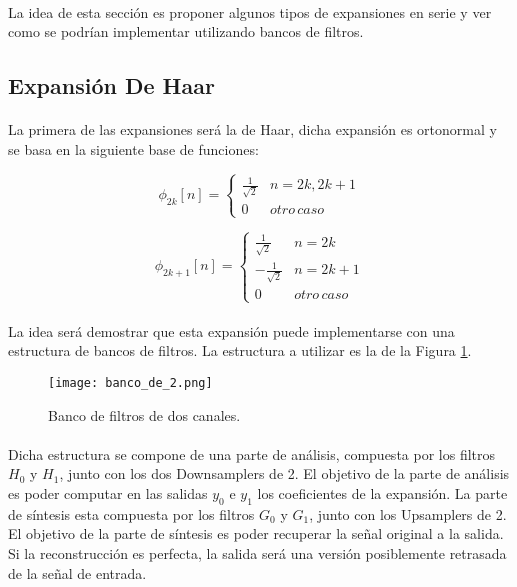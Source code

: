 \paragraph{}
La idea de esta sección es proponer algunos tipos de expansiones en serie y ver como se podrían implementar utilizando bancos de filtros.

\subsection{Expansión De Haar}

\paragraph{}
La primera de las expansiones será la de Haar, dicha expansión es ortonormal y se basa en la siguiente base de funciones:

\[ \phi_{2k}[n] = \begin{cases} 
      \frac{1}{\sqrt{2}} & n = 2 k, 2 k + 1 \\
      0 & otro \, caso
   \end{cases}
\]

\[ \phi_{2k + 1}[n] = \begin{cases} 
      \frac{1}{\sqrt{2}} & n = 2 k \\
      -\frac{1}{\sqrt{2}} & n = 2 k + 1 \\
      0 & otro \, caso
   \end{cases}
\]

\paragraph{}
La idea será demostrar que esta expansión puede implementarse con una estructura de bancos de filtros. La estructura a utilizar es la de la Figura \ref{fig:banco_de_2}.

	\begin{figure}[h!]
		\centering
		\texttt{[image: banco\_de\_2.png]}
		\caption{Banco de filtros de dos canales.}
		\label{fig:banco_de_2}
	\end{figure}
	
\paragraph{}
Dicha estructura se compone de una parte de análisis, compuesta por los filtros $H_{0}$ y $H_{1}$, junto con los dos Downsamplers de 2. El objetivo de la parte de análisis es poder computar en las salidas $y_{0}$ e $y_{1}$ los coeficientes de la expansión. La parte de síntesis esta compuesta por los filtros $G_{0}$ y $G_{1}$, junto con los Upsamplers de 2. El objetivo de la parte de síntesis es poder recuperar la señal original a la salida. Si la reconstrucción es perfecta, la salida será una versión posiblemente retrasada de la señal de entrada.


